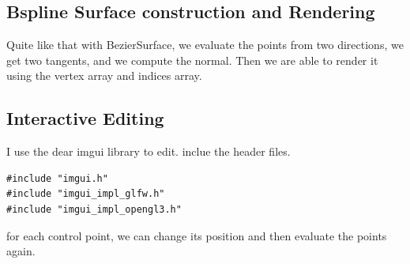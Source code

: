 \documentclass[acmtog]{acmart}
\begin{document}
\subsection{Bspline Surface construction and Rendering}
Quite like that with BezierSurface, we evaluate the points from two directions, we get two tangents, and we compute the normal. Then we are able to render it using the
vertex array and indices array.

\subsection{Interactive Editing}
I use the dear imgui library to edit. inclue the header files.
\begin{lstlisting}
#include "imgui.h"
#include "imgui_impl_glfw.h"
#include "imgui_impl_opengl3.h"
\end{lstlisting}
for each control point, we can change its position and then evaluate the points again.
\end{document}
